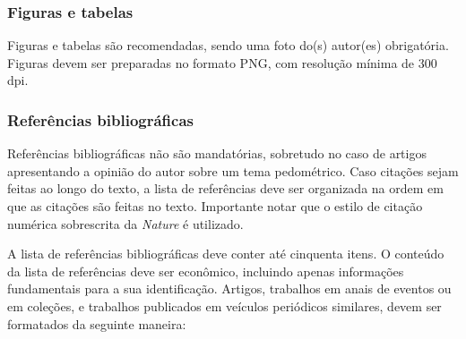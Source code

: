 \subsubsection{Figuras e tabelas}

Figuras e tabelas são recomendadas, sendo uma foto do(s) autor(es) obrigatória. Figuras devem ser preparadas no formato PNG, com resolução mínima de 300 dpi.

\subsubsection{Referências bibliográficas}

Referências bibliográficas não são mandatórias, sobretudo no caso de artigos apresentando a opinião do autor sobre um tema pedométrico. Caso citações sejam feitas ao longo do texto, a lista de referências deve ser organizada na ordem em que as citações são feitas no texto. Importante notar que o estilo de citação numérica sobrescrita da \textit{Nature} é utilizado.

A lista de referências bibliográficas deve conter até cinquenta itens. O conteúdo da lista de referências deve ser econômico, incluindo apenas informações fundamentais para a sua identificação. Artigos, trabalhos em anais de eventos ou em coleções, e trabalhos publicados em veículos periódicos similares, devem ser formatados da seguinte maneira:

\vspace{0.5cm}
\vspace{0.5cm}


\vspace{0.5cm}
\vspace{0.5cm}


